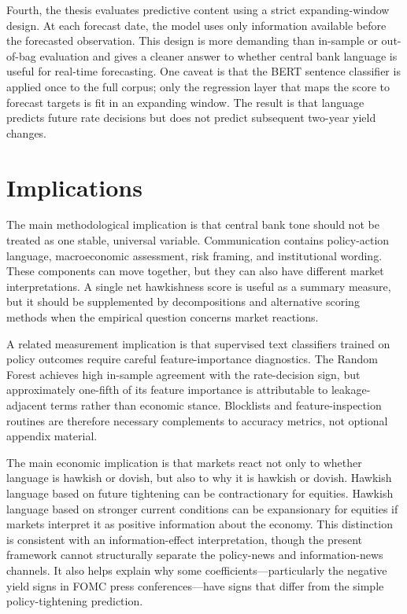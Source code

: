 Fourth, the thesis evaluates predictive content using a strict expanding-window
design. At each forecast date, the model uses only information available before
the forecasted observation. This design is more demanding than in-sample or
out-of-bag evaluation and gives a cleaner answer to whether central bank
language is useful for real-time forecasting. One caveat is that the
BERT sentence classifier is applied once to the full corpus; only the
regression layer that maps the score to forecast targets is fit in an expanding
window. The result is that language predicts future rate decisions but does not
predict subsequent two-year yield changes.

\section{Implications}
\label{sec:conc_implications}

The main methodological implication is that central bank tone should not be
treated as one stable, universal variable. Communication contains policy-action
language, macroeconomic assessment, risk framing, and institutional wording.
These components can move together, but they can also have different market
interpretations. A single net hawkishness score is useful as a summary measure,
but it should be supplemented by decompositions and alternative scoring methods
when the empirical question concerns market reactions.

A related measurement implication is that supervised text classifiers trained on
policy outcomes require careful feature-importance diagnostics. The Random
Forest achieves high in-sample agreement with the rate-decision sign, but
approximately one-fifth of its feature importance is attributable to
leakage-adjacent terms rather than economic stance. Blocklists and
feature-inspection routines are therefore necessary complements to accuracy
metrics, not optional appendix material.

The main economic implication is that markets react not only to whether language
is hawkish or dovish, but also to why it is hawkish or dovish. Hawkish language
based on future tightening can be contractionary for equities. Hawkish language
based on stronger current conditions can be expansionary for equities if markets
interpret it as positive information about the economy. This distinction is
consistent with an information-effect interpretation, though the present
framework cannot structurally separate the policy-news and information-news
channels. It also helps explain why some coefficients---particularly the
negative yield signs in FOMC press conferences---have signs that differ from the
simple policy-tightening prediction.

